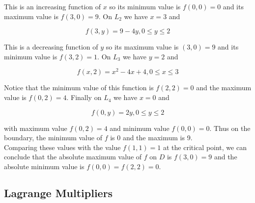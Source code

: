         This is an increasing function of $x$ so its minimum value is $f(0,0) = 0$ and its maximum value is $f(3,0) = 9$. On $L_2$ we have $x=3$ and

        \[
            f(3, y) = 9 - 4y, 0 \leq y \leq 2
        \]

        This is a decreasing function of $y$ so its maximum value is $(3,0) = 9$ and its minimum value is $f(3,2) = 1$. On $L_3$ we have $y=2$ and

        \[
            f(x,2) = x^2 - 4x + 4, 0 \leq x \leq 3
        \]

        Notice that the minimum value of this function is $f(2,2) = 0$ and the maximum value is $f(0,2) = 4$. Finally on $L_4$ we have $x=0$ and

        \[
            f(0,y) = 2y, 0 \leq y \leq 2
        \]

        with maximum value $f(0,2) = 4$ and minimum value $f(0,0) = 0$. Thus on the boundary, the minimum value of $f$ is 0 and the maximum is 9. \\

        Comparing these values with the value $f(1,1) = 1$ at the critical point, we can conclude that the absolute maximum value of $f$ on $D$ is $f(3,0) = 9$ and the absolute minimum value is $f(0,0) = f(2,2) = 0$.

    \subsection{Lagrange Multipliers}   %